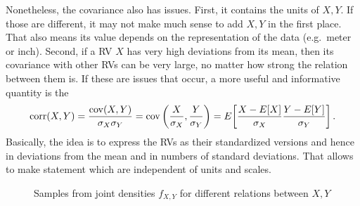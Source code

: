 Nonetheless, the covariance also has issues. First, it contains the units of $X, Y$. If those are different, it may not make much sense to add $X, Y$ in the first place. That also means its value depends on the representation of the data (e.g.~meter or inch). Second, if a RV $X$ has very high deviations from its mean, then its covariance with other RVs can be very large, no matter how strong the relation between them is. If these are issues that occur, a more useful and informative quantity is the 
\begin{equation}
\operatorname{corr}(X, Y) = \frac{\operatorname{cov}(X, Y)}{\sigma_X \sigma_Y} = \operatorname{cov}\qty(\frac{X}{\sigma_X}, \frac{Y}{\sigma_Y})
= E\qty[\frac{X - E[X]}{\sigma_X} \frac{Y - E[Y]}{\sigma_Y}] \, .
\end{equation}
Basically, the idea is to express the RVs as their standardized versions and hence in deviations from the mean and in numbers of standard deviations. That allows to make statement which are independent of units and scales.\\



\begin{figure}
\centering

\iffalse
{

\def\Square{(-2.5,-2.5) rectangle (2.5,2.5)}
\def\EllipseA{(0,0) ellipse [rotate=-45, x radius=0.8, y radius=2]}
\def\EllipseB{(0,0) ellipse [rotate=45, x radius=0.8, y radius=2]}


\subfloat[Uncorrelated ($\Cov(X, Y) = 0$)]{
\begin{tikzpicture}
\draw \Square;
\draw[pattern=north west lines, pattern color=black] circle(1.6);\Circle;
\end{tikzpicture}
}
%
\subfloat[Correlated ($\Cov(X, Y) > 0$)]{
\begin{tikzpicture}
\draw \Square;
\draw[pattern=north west lines, pattern color=black] \EllipseA;
\end{tikzpicture}
}
%
\subfloat[Anticorrelated ($\Cov(X, Y) < 0$)]{
\begin{tikzpicture}
\draw \Square;
\draw[pattern=north west lines, pattern color=black] \EllipseB;
\end{tikzpicture}
}

\caption{Schematic plot of joint densities $f_{X, Y}$ for different relations between $X, Y$}

}
\fi

%
%


\caption{Samples from joint densities $f_{X, Y}$ for different relations between $X, Y$}
\label{fig:correlations}
\end{figure}



